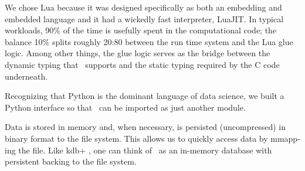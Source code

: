 We chose Lua
because it was designed specifically as both an embedding and embedded language
\cite{Lua2011,Lua2018} and it had a wickedly fast interpreter, LuaJIT. 
In typical workloads, 90\% of the time is usefully spent in the computational
code; the balance 10\% splits roughly 20:80 between the
run time system and the Lua glue logic. Among other things, the glue logic
serves as the bridge between the dynamic typing that \Q\
supports and the static typing required by the C code underneath.

Recognizing that Python is the dominant language of data science, we built a
Python interface so that \Q\ can be imported as just another module.

Data is stored in memory and, when necessary, is persisted (uncompressed) in
binary format to the file system. This allows us to quickly access data by
mmapp-ing the file.  Like kdb+ \cite{Borror2015}, one can think of \Q\ as 
an in-memory database with persistent backing to the file system.




